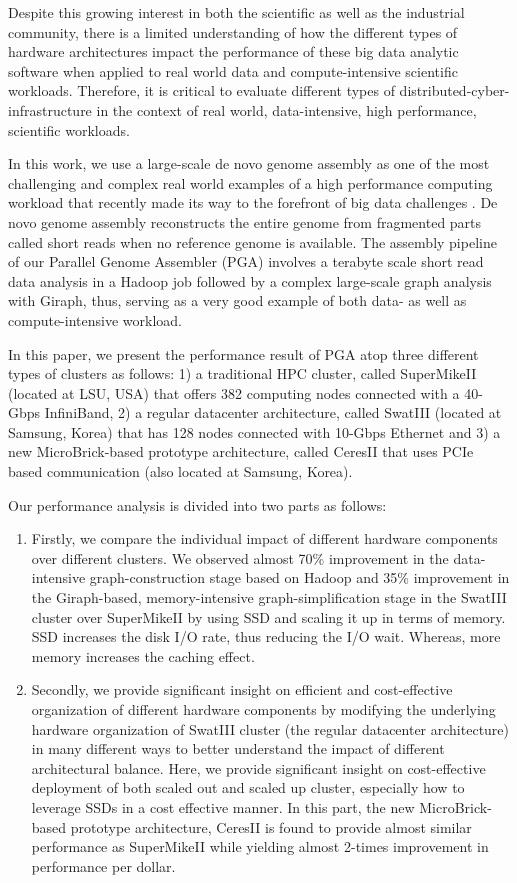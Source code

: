 \documentclass[conference]{IEEEtran}
\begin{document}
Despite this growing interest in both the scientific as well as the industrial community, there is a limited understanding of how the different types of hardware architectures impact the performance of these big data analytic software when applied to real world data and compute-intensive scientific workloads. Therefore, it is critical to evaluate different types of distributed-cyber-infrastructure in the context of real world, data-intensive, high performance, scientific workloads.   

In this work, we use a large-scale de novo genome assembly as one of the most challenging and complex real world examples of a high performance computing workload that recently made its way to the forefront of big data challenges \cite{bigGenome:graphtraverse} \cite{biggenome:kmerpartition}. De novo genome assembly reconstructs the entire genome from fragmented parts called short reads when no reference genome is available. The assembly pipeline of our Parallel Genome Assembler (PGA) involves a terabyte scale short read data analysis in a Hadoop job followed by a complex large-scale graph analysis with Giraph, thus, serving as a very good example of both data- as well as compute-intensive workload.

In this paper, we present the performance result of PGA atop three different types of clusters as follows: 
1) a traditional HPC cluster, called SuperMikeII (located at LSU, USA) that offers 382 computing nodes connected with a 40-Gbps InfiniBand, 
2) a regular datacenter architecture, called SwatIII (located at Samsung, Korea) that has 128 nodes connected with 10-Gbps Ethernet and 
3) a new MicroBrick-based prototype architecture, called CeresII that uses PCIe based communication (also located at Samsung, Korea). 

Our performance analysis is divided into two parts as follows: 
\begin{enumerate}
\item Firstly, we compare the individual impact of different hardware components over different clusters. We observed almost 70\% improvement in the data-intensive graph-construction stage based on Hadoop and 35\% improvement in the Giraph-based, memory-intensive graph-simplification stage in the SwatIII cluster over SuperMikeII by using SSD and scaling it up in terms of memory. SSD increases the disk I/O rate, thus reducing the I/O wait. Whereas, more memory increases the caching effect. 
\item Secondly, we provide significant insight on efficient and cost-effective organization of different hardware components by modifying the underlying hardware organization of SwatIII cluster (the regular datacenter architecture) in many different ways to better understand the impact of different architectural balance. Here, we provide significant insight on cost-effective deployment of both scaled out and scaled up cluster, especially how to leverage SSDs in a cost effective manner. 
In this part, the new MicroBrick-based prototype architecture, CeresII is found to provide almost similar performance as SuperMikeII while yielding almost 2-times improvement in performance per dollar. 
\end{enumerate}
\end{document}
